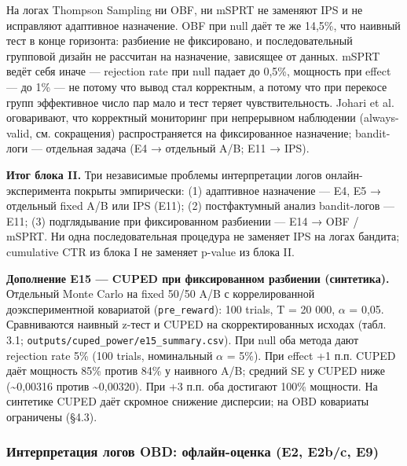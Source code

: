 На логах Thompson Sampling ни OBF, ни mSPRT не заменяют IPS и не исправляют адаптивное назначение. OBF при null даёт те же 14,5\%, что наивный тест в конце горизонта: разбиение не фиксировано, и последовательный групповой дизайн не рассчитан на назначение, зависящее от данных. mSPRT ведёт себя иначе --- rejection rate при null падает до 0,5\%, мощность при effect --- до 1\% --- не потому что вывод стал корректным, а потому что при перекосе групп эффективное число пар мало и тест теряет чувствительность. Johari et al.~\cite{ref19} оговаривают, что корректный мониторинг при непрерывном наблюдении (always-valid, см. сокращения) распространяется на фиксированное назначение; bandit-логи --- отдельная задача (E4 → отдельный A/B; E11 → IPS).

\textbf{Итог блока II.} Три независимые проблемы интерпретации логов онлайн-эксперимента покрыты эмпирически: (1) адаптивное назначение --- E4, E5 → отдельный fixed A/B или IPS (E11); (2) постфактумный анализ bandit-логов --- E11; (3) подглядывание при фиксированном разбиении --- E14 → OBF / mSPRT. Ни одна последовательная процедура не заменяет IPS на логах бандита; cumulative CTR из блока I не заменяет p-value из блока II.

\textbf{Дополнение E15 --- CUPED при фиксированном разбиении (синтетика).} Отдельный Monte Carlo на fixed 50/50 A/B с коррелированной доэкспериментной ковариатой (\texttt{pre\_reward}): 100 trials, T = 20 000, $\alpha$ = 0,05. Сравниваются наивный z-тест и CUPED \cite{ref7} на скорректированных исходах (табл. 3.1; \texttt{outputs/cuped\_power/e15\_summary.csv}). При null оба метода дают rejection rate 5\% (100 trials, номинальный $\alpha$ = 5\%). При effect +1 п.п. CUPED даёт мощность 85\% против 84\% у наивного A/B; средний SE у CUPED ниже (\textasciitilde0,00316 против \textasciitilde0,00320). При +3 п.п. оба достигают 100\% мощности. На синтетике CUPED даёт скромное снижение дисперсии; на OBD ковариаты ограничены (§4.3).

\subsubsection{Интерпретация логов OBD: офлайн-оценка (E2, E2b/c, E9)}\label{ux438ux43dux442ux435ux440ux43fux440ux435ux442ux430ux446ux438ux44f-ux43bux43eux433ux43eux432-obd-ux43eux444ux43bux430ux439ux43d-ux43eux446ux435ux43dux43aux430-e2-e2bc-e9}

